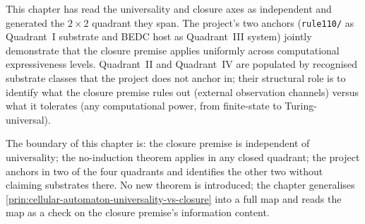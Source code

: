 This chapter has read the universality and closure axes as independent and generated the $2 \times 2$ quadrant they span. The project's two anchors (\texttt{rule110/} as Quadrant~I substrate and BEDC host as Quadrant~III system) jointly demonstrate that the closure premise applies uniformly across computational expressiveness levels. Quadrant~II and Quadrant~IV are populated by recognised substrate classes that the project does not anchor in; their structural role is to identify what the closure premise rules out (external observation channels) versus what it tolerates (any computational power, from finite-state to Turing-universal).

The boundary of this chapter is: the closure premise is independent of universality; the no-induction theorem applies in any closed quadrant; the project anchors in two of the four quadrants and identifies the other two without claiming substrates there. No new theorem is introduced; the chapter generalises \autoref{prin:cellular-automaton-universality-vs-closure} into a full map and reads the map as a check on the closure premise's information content.

